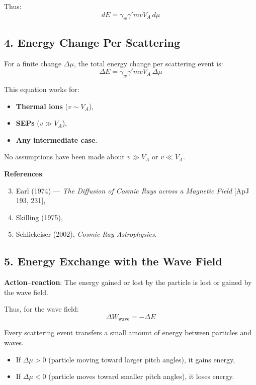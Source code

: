 Thus:
\begin{equation}
dE = \gamma_w \gamma' m v V_A \, d\mu
\tag{8}
\end{equation}

\hrulefill

\subsection*{4. \textbf{Energy Change Per Scattering}}

For a finite change $\Delta \mu$, the total energy change per scattering event is:
\begin{equation}
\boxed{ \Delta E = \gamma_w \gamma' m v V_A \, \Delta \mu }
\tag{9}
\end{equation}

This equation works for:
\begin{itemize}
    \item \textbf{Thermal ions} ($v \sim V_A$),
    \item \textbf{SEPs} ($v \gg V_A$),
    \item \textbf{Any intermediate case}.
\end{itemize}

No assumptions have been made about $v \gg V_A$ or $v \ll V_A$.

\noindent
\textbf{References}:
\begin{enumerate}
    \setcounter{enumi}{2}
    \item Earl (1974) --- \textit{The Diffusion of Cosmic Rays across a Magnetic Field} [ApJ 193, 231],
    \item Skilling (1975),
    \item Schlickeiser (2002), \textit{Cosmic Ray Astrophysics}.
\end{enumerate}

\hrulefill

\subsection*{5. \textbf{Energy Exchange with the Wave Field}}

\textbf{Action--reaction}: The energy gained or lost by the particle is lost or gained by the wave field.

Thus, for the wave field:
\begin{equation}
\boxed{ \Delta W_{\text{wave}} = - \Delta E }
\tag{10}
\end{equation}

Every scattering event transfers a small amount of energy between particles and waves.
\begin{itemize}
    \item If $\Delta \mu > 0$ (particle moving toward larger pitch angles), it gains energy,
    \item If $\Delta \mu < 0$ (particle moves toward smaller pitch angles), it loses energy.
\end{itemize}

